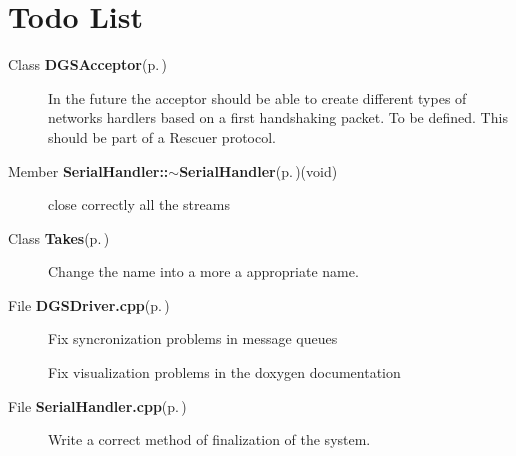 \section{Todo List}\label{todo}
\label{todo__todo000001}
 \begin{description}
\item[Class {\bf DGSAcceptor}{\rm (p.\,\pageref{classDGSAcceptor})} ]In the future the acceptor should be able to create different types of networks hardlers based on a first handshaking packet. To be defined. This should be part of a Rescuer protocol. \end{description}


\label{todo__todo000006}
 \begin{description}
\item[Member {\bf Serial\-Handler::$\sim$Serial\-Handler}{\rm (p.\,\pageref{classSerialHandler_a1})}(void) ]close correctly all the streams \end{description}


\label{todo__todo000004}
 \begin{description}
\item[Class {\bf Takes}{\rm (p.\,\pageref{classTakes})} ]Change the name into a more a appropriate name. \end{description}


\label{todo__todo000002}
 \begin{description}
\item[File {\bf DGSDriver.cpp}{\rm (p.\,\pageref{DGSDriver_8cpp})} ]Fix syncronization problems in message queues 

Fix visualization problems in the doxygen documentation \end{description}


\label{todo__todo000005}
 \begin{description}
\item[File {\bf Serial\-Handler.cpp}{\rm (p.\,\pageref{SerialHandler_8cpp})} ]Write a correct method of finalization of the system. \end{description}
